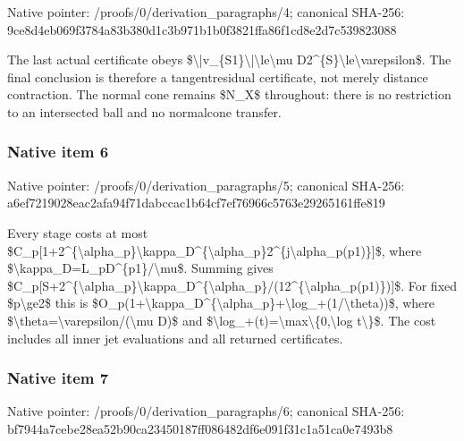 \documentclass[10pt,a4paper]{article}
\begin{document}
Native pointer: /proofs/0/derivation\_paragraphs/4; canonical SHA-256: 9ce8d4eb069f3784a83b380d\allowbreak{}1c3b971b1b0f3821ffa86f1c\allowbreak{}d8e2d7c539823088


The last actual certificate obeys \$\textbackslash{}|v\_\{S1\}\textbackslash{}|\textbackslash{}le\textbackslash{}mu D2\textasciicircum{}\{S\}\textbackslash{}le\textbackslash{}varepsilon\$. The final conclusion is therefore a tangentresidual certificate, not merely distance contraction. The normal cone remains \$N\_X\$ throughout: there is no restriction to an intersected ball and no normalcone transfer.


\subsubsection{Native item 6}


Native pointer: /proofs/0/derivation\_paragraphs/5; canonical SHA-256: a6ef7219028eac2afa94f71d\allowbreak{}abccac1b64cf7ef76966c576\allowbreak{}3e29265161ffe819


Every stage costs at most \$C\_p[1+2\textasciicircum{}\{\textbackslash{}alpha\_p\}\textbackslash{}kapp\allowbreak{}a\_D\textasciicircum{}\{\textbackslash{}alpha\_p\}2\textasciicircum{}\{j\textbackslash{}alph\allowbreak{}a\_p(p1)\}]\$, where \$\textbackslash{}kappa\_D=L\_pD\textasciicircum{}\{p1\}/\textbackslash{}mu\$. Summing gives \$C\_p[S+2\textasciicircum{}\{\textbackslash{}alpha\_p\}\textbackslash{}kapp\allowbreak{}a\_D\textasciicircum{}\{\textbackslash{}alpha\_p\}/(12\textasciicircum{}\{\textbackslash{}a\allowbreak{}lpha\_p(p1)\})]\$. For fixed \$p\textbackslash{}ge2\$ this is \$O\_p(1+\textbackslash{}kappa\_D\textasciicircum{}\{\textbackslash{}alpha\_\allowbreak{}p\}+\textbackslash{}log\_+(1/\textbackslash{}theta))\$, where \$\textbackslash{}theta=\textbackslash{}varepsilon/(\textbackslash{}mu D)\$ and \$\textbackslash{}log\_+(t)=\textbackslash{}max\textbackslash{}\{0,\textbackslash{}log t\textbackslash{}\}\$. The cost includes all inner jet evaluations and all returned certificates.


\subsubsection{Native item 7}


Native pointer: /proofs/0/derivation\_paragraphs/6; canonical SHA-256: bf7944a7cebe28ea52b90ca2\allowbreak{}3450187ff086482df6e091f3\allowbreak{}1c1a51ca0e7493b8
\end{document}
